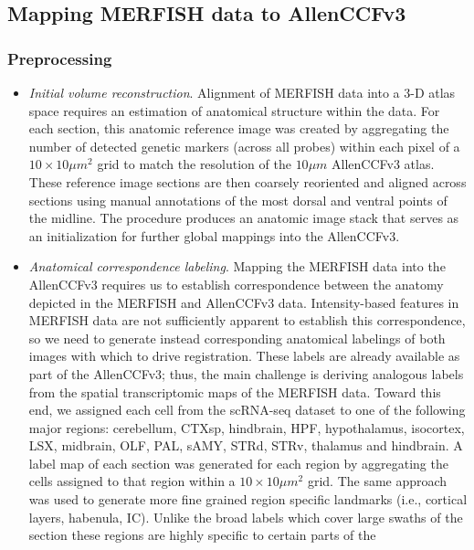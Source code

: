 \documentclass[
  12pt,
]{article}
\begin{document}
\subsection{Mapping MERFISH data to
AllenCCFv3}\label{mapping-merfish-data-to-allenccfv3}

\subsubsection{Preprocessing}\label{preprocessing-1}

\begin{itemize}
\item
  \emph{Initial volume reconstruction}. Alignment of MERFISH data into a
  3-D atlas space requires an estimation of anatomical structure within
  the data. For each section, this anatomic reference image was created
  by aggregating the number of detected genetic markers (across all
  probes) within each pixel of a \(10
  \times 10 \mu m^2\) grid to match the resolution of the \(10 \mu m\)
  AllenCCFv3 atlas. These reference image sections are then coarsely
  reoriented and aligned across sections using manual annotations of the
  most dorsal and ventral points of the midline. The procedure produces
  an anatomic image stack that serves as an initialization for further
  global mappings into the AllenCCFv3.
\item
  \emph{Anatomical correspondence labeling}. Mapping the MERFISH data
  into the AllenCCFv3 requires us to establish correspondence between
  the anatomy depicted in the MERFISH and AllenCCFv3 data.
  Intensity-based features in MERFISH data are not sufficiently apparent
  to establish this correspondence, so we need to generate instead
  corresponding anatomical labelings of both images with which to drive
  registration. These labels are already available as part of the
  AllenCCFv3; thus, the main challenge is deriving analogous labels from
  the spatial transcriptomic maps of the MERFISH data. Toward this end,
  we assigned each cell from the scRNA-seq dataset to one of the
  following major regions: cerebellum, CTXsp, hindbrain, HPF,
  hypothalamus, isocortex, LSX, midbrain, OLF, PAL, sAMY, STRd, STRv,
  thalamus and hindbrain. A label map of each section was generated for
  each region by aggregating the cells assigned to that region within a
  \(10 \times 10 \mu m^2\) grid. The same approach was used to generate
  more fine grained region specific landmarks (i.e., cortical layers,
  habenula, IC). Unlike the broad labels which cover large swaths of the
  section these regions are highly specific to certain parts of the

\end{itemize}
\end{document}
